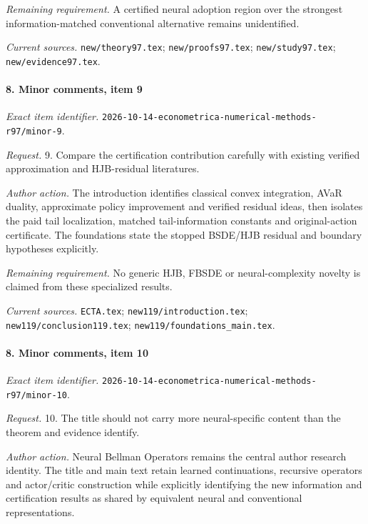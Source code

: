 \par\emph{Remaining requirement.} A certified neural adoption region over the strongest information-matched conventional alternative remains unidentified.

\par\emph{Current sources.} \nolinkurl{new/theory97.tex}; \nolinkurl{new/proofs97.tex}; \nolinkurl{new/study97.tex}; \nolinkurl{new/evidence97.tex}.

\paragraph{8. Minor comments, item 9}

\emph{Exact item identifier.} \nolinkurl{2026-10-14-econometrica-numerical-methods-r97/minor-9}.

\par\emph{Request.} 9. Compare the certification contribution carefully with existing verified approximation and HJB-residual literatures.

\par\emph{Author action.} The introduction identifies classical convex integration, AVaR duality, approximate policy improvement and verified residual ideas, then isolates the paid tail localization, matched tail-information constants and original-action certificate. The foundations state the stopped BSDE/\allowbreak{}HJB residual and boundary hypotheses explicitly.

\par\emph{Remaining requirement.} No generic HJB, FBSDE or neural-complexity novelty is claimed from these specialized results.

\par\emph{Current sources.} \nolinkurl{ECTA.tex}; \nolinkurl{new119/introduction.tex}; \nolinkurl{new119/conclusion119.tex}; \nolinkurl{new119/foundations_main.tex}.

\paragraph{8. Minor comments, item 10}

\emph{Exact item identifier.} \nolinkurl{2026-10-14-econometrica-numerical-methods-r97/minor-10}.

\par\emph{Request.} 10. The title should not carry more neural-specific content than the theorem and evidence identify.

\par\emph{Author action.} Neural Bellman Operators remains the central author research identity. The title and main text retain learned continuations, recursive operators and actor/\allowbreak{}critic construction while explicitly identifying the new information and certification results as shared by equivalent neural and conventional representations.

